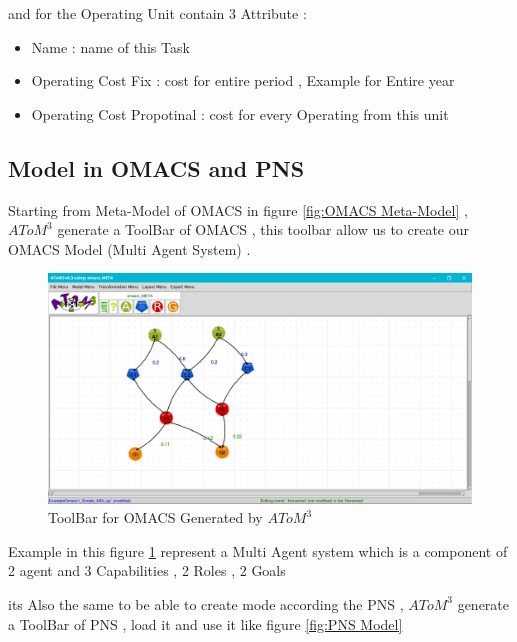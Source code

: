 and for the Operating Unit contain 3 Attribute : 
\begin{itemize}

\item Name : name of this Task 
\item Operating Cost Fix  : cost for entire period ,  Example for Entire year
\item Operating Cost Propotinal  :  cost for every Operating from this unit

\end{itemize}

\pagebreak

\subsection{ Model in OMACS and PNS }

Starting from  Meta-Model of OMACS in figure  \ref{fig:OMACS Meta-Model}  , $AToM^3$ generate a ToolBar of OMACS  , this toolbar allow us to create our OMACS Model (Multi Agent System) .
\vspace{0.1cm}
\begin{figure}[th]
	\centering
 	\includegraphics[scale=0.3]{Chapiter3/img/omacs_model}
	\caption{\label{fig:OMACS Model}ToolBar for OMACS Generated by $AToM^3$ }
\end{figure} 

Example in this figure \ref{fig:OMACS Model} represent a Multi Agent system which is  a component of 2 agent and 3 Capabilities , 2 Roles , 2 Goals
\vspace{0.1cm}


its Also the same to be able to create mode according the PNS , $AToM^3$ generate a ToolBar of PNS , load it and use it like figure \ref{fig:PNS Model}

